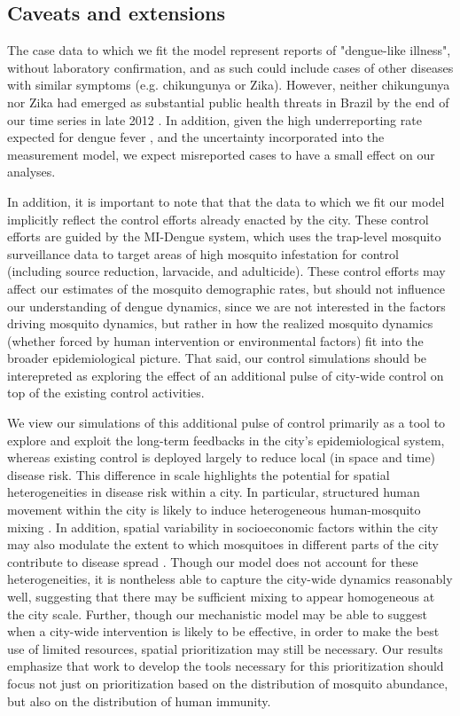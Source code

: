\documentclass[10pt,letterpaper]{article}
\begin{document}
\subsection*{Caveats and extensions}

The case data to which we fit the model represent reports of "dengue-like illness", without laboratory confirmation, and as such could include cases of other diseases with similar symptoms (e.g. chikungunya or Zika).
However, neither chikungunya nor Zika had emerged as substantial public health threats in Brazil by the end of our time series in late 2012 \cite{PAHO2014, PAHO2015}.
In addition, given the high underreporting rate expected for dengue fever \cite{Silva2016}, and the uncertainty incorporated into the measurement model, we expect misreported cases to have a small effect on our analyses.

In addition, it is important to note that that the data to which we fit our model implicitly reflect the control efforts already enacted by the city.
These control efforts are guided by the MI-Dengue system, which uses the trap-level mosquito surveillance data to target areas of high mosquito infestation for control (including source reduction, larvacide, and adulticide)\cite{Eiras2009}.
These control efforts may affect our estimates of the mosquito demographic rates, but should not influence our understanding of dengue dynamics, since we are not interested in the factors driving mosquito dynamics, but rather in how the realized mosquito dynamics (whether forced by human intervention or environmental factors) fit into the broader epidemiological picture.
That said, our control simulations should be interepreted as exploring the effect of an additional pulse of city-wide control on top of the existing control activities.

We view our simulations of this additional pulse of control primarily as a tool to explore and exploit the long-term feedbacks in the city's epidemiological system, whereas existing control is deployed largely to reduce local (in space and time) disease risk.
This difference in scale highlights the potential for spatial heterogeneities in disease risk within a city.
In particular, structured human movement within the city is likely to induce heterogeneous human-mosquito mixing \cite{Adams2009, Cosner2009a, Stoddard2009}.
In addition, spatial variability in socioeconomic factors within the city may also modulate the extent to which mosquitoes in different parts of the city contribute to disease spread \cite{Mondini2008, Honorio2009, Hu2012, DeMattosAlmeida2007}.
Though our model does not account for these heterogeneities, it is nontheless able to capture the city-wide dynamics reasonably well, suggesting that there may be sufficient mixing to appear homogeneous at the city scale.
Further, though our mechanistic model may be able to suggest when a city-wide intervention is likely to be effective, in order to make the best use of limited resources, spatial prioritization may still be necessary.
Our results emphasize that work to develop the tools necessary for this prioritization should focus not just on prioritization based on the distribution of mosquito abundance, but also on the distribution of human immunity.
\end{document}
